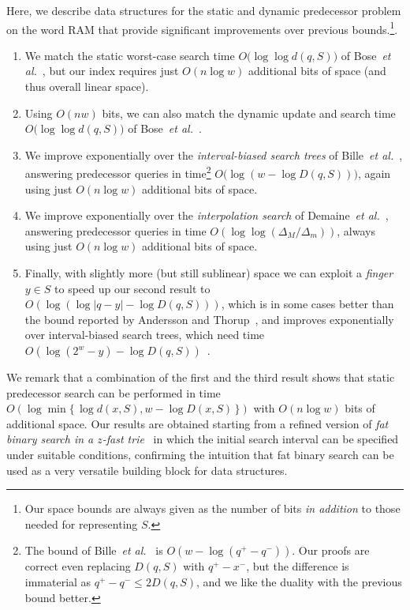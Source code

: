\documentclass[a4paper,11pt]{article}
\newcommand{\etal}{\emph{et al.}\xspace}
\newcommand{\?}{\mskip1.5mu}
\begin{document}
Here, we describe data structures for the
static and dynamic predecessor problem
on the word RAM that provide significant 
improvements over previous bounds.\footnote{Our 
space bounds are always given as the
number of bits \emph{in addition} to those needed for 
representing $S$.}. 

\begin{enumerate}
  \item We match the static worst-case search time 
  $O\big(\log\log d(q, S)\big)$
  of Bose~\etal~\cite{BoseDoDuHoMo13}, but our index requires 
  just $O(n\log w)$ additional bits of space (and thus overall 
  linear space).
  \item Using $O(nw)$ bits, we can also match the dynamic
  update and search time $O\big(\log\log d(q, S)\big)$
  of Bose~\etal~\cite{BoseDoDuHoMo13}.
  \item We improve exponentially over the \emph{interval-biased search
  trees} of Bille~\etal~\cite{BilleLaRaSaSaWe15}, answering 
  predecessor queries in time\footnote{The
  bound of Bille~\etal~\cite{BilleLaRaSaSaWe15} is 
  $O(w - \log(q^+ - q^-))$. Our 
  proofs are correct even replacing $D(q, S)$ with $q^+ - x^-$, but 
  the difference is immaterial as $q^+ - q^-\leq 2D(q, S)$, and 
  we like the duality with the previous bound better.} 
  $O\big(\log(w - \log D(q, S))\big)$, again using just 
  $O(n\log w)$ additional bits of space.
  \item We improve exponentially over the \emph{interpolation
  search} of Demaine~\etal~\cite{DemaineJoPa04}, answering
  predecessor queries in time 
  $O\left(\log\log(\Delta_M / \Delta_m)\right)$, always using 
  just $O(n\log w)$ additional bits of space.
  \item Finally, with slightly more (but still sublinear) space 
  we can exploit a \emph{finger} $y \in S$ to speed up our second 
  result to $O\left(\log(\log|q - y| - \log D(q, S))\right)$, which is in
  some cases better than the bound reported
  by Andersson and Thorup~\cite{AnderssonTh07}, and improves 
  exponentially over interval-biased search trees, which need 
  time  
  $O\left(\log(2^w - y) - \log D(q, S)\right)$~\cite{BilleLaRaSaSaWe15}.
\end{enumerate}

We remark that a combination of the first
and the third result shows that static predecessor 
search can be performed in time  
$O\left(\log \min \{\,\log d(x,S),w-\log D(x,S)\,\}\right)$ 
with $O(n \log w)$ bits of additional space. Our 
results are obtained starting from a refined version of
\emph{fat binary search in a $z$-fast trie}~\cite{BelazzouguiBoPaVi09} 
in which the initial search interval can be specified under 
suitable conditions, confirming the intuition that fat
binary search can be used as a very versatile building block 
for data structures.
\end{document}
